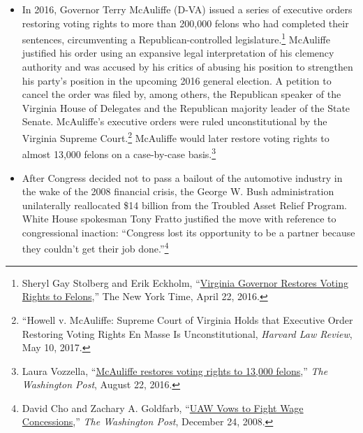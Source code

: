 \documentclass[12pt]{article}
\begin{document}
\begin{itemize}

\item In 2016, Governor Terry McAuliffe (D-VA) issued a series of executive orders restoring voting rights to more than 200,000 felons who had completed their sentences, circumventing a Republican-controlled legislature.\footnote{Sheryl Gay Stolberg and Erik Eckholm, ``\href{https://www.nytimes.com/2016/04/23/us/governor-terry-mcauliffe-virginia-voting-rights-convicted-felons.html}{Virginia Governor Restores Voting Rights to Felons},'' The New York Time, April 22, 2016.} McAuliffe justified his order using an expansive legal interpretation of his clemency authority and was accused by his critics of abusing his position to strengthen his party's position in the upcoming 2016 general election. A petition to cancel the order was filed by, among others, the Republican speaker of the Virginia House of Delegates and the Republican majority leader of the State Senate. McAuliffe's executive orders were ruled unconstitutional by the Virginia Supreme Court.\footnote{``Howell v. McAuliffe: Supreme Court of Virginia Holds that Executive Order Restoring Voting Rights En Masse Is Unconstitutional, \emph{Harvard Law Review}, May 10, 2017.} McAuliffe would later restore voting rights to almost 13,000 felons on a case-by-case basis.\footnote{Laura Vozzella, ``\href{https://www.washingtonpost.com/local/virginia-politics/mcauliffe-restores-voting-rights-to-13000-felons/2016/08/22/2372bb72-6878-11e6-99bf-f0cf3a6449a6_story.html?utm_term=.918853ccb0ad}{McAuliffe restores voting rights to 13,000 felons},'' \emph{The Washington Post},
August 22, 2016.}

\item After Congress decided not to pass a bailout of the automotive industry in the wake of the 2008 financial crisis, the George W. Bush administration unilaterally reallocated \$14 billion from the Troubled Asset Relief Program. White House spokesman Tony Fratto justified the move with reference to congressional inaction: ``Congress lost its opportunity to be a partner because they couldn't get their job done.''\footnote{David Cho and Zachary A. Goldfarb, ``\href{http://www.washingtonpost.com/wp-dyn/content/article/2008/12/23/AR2008122302475.html}{UAW Vows to Fight Wage Concessions},'' \emph{The Washington Post}, December 24, 2008.}


\end{itemize}
\end{document}
